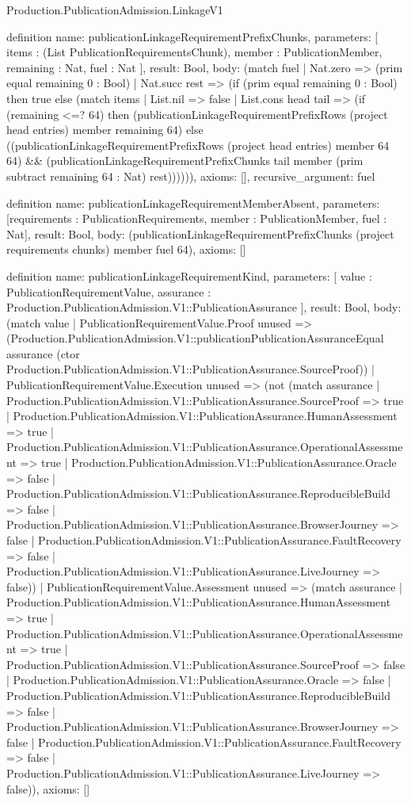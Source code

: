 \begin{lexlean}{Production.PublicationAdmission.LinkageV1}
\begin{semanticmodule}
definition{
  name: publicationLinkageRequirementPrefixChunks,
  parameters: [
    items : (List PublicationRequirementsChunk),
    member : PublicationMember,
    remaining : Nat,
    fuel : Nat
  ],
  result: Bool,
  body: (match fuel
    | Nat.zero => (prim equal remaining 0 : Bool)
    | Nat.succ rest => (if (prim equal remaining 0 : Bool) then true else (match items
      | List.nil => false
      | List.cons head tail => (if (remaining <=? 64) then (publicationLinkageRequirementPrefixRows (project head entries) member remaining 64) else ((publicationLinkageRequirementPrefixRows (project head entries) member 64 64) && (publicationLinkageRequirementPrefixChunks tail member (prim subtract remaining 64 : Nat) rest)))))),
  axioms: [],
  recursive_argument: fuel
}

definition{
  name: publicationLinkageRequirementMemberAbsent,
  parameters: [requirements : PublicationRequirements, member : PublicationMember, fuel : Nat],
  result: Bool,
  body: (publicationLinkageRequirementPrefixChunks (project requirements chunks) member fuel 64),
  axioms: []
}

definition{
  name: publicationLinkageRequirementKind,
  parameters: [
    value : PublicationRequirementValue,
    assurance : Production.PublicationAdmission.V1::PublicationAssurance
  ],
  result: Bool,
  body: (match value
    | PublicationRequirementValue.Proof unused => (Production.PublicationAdmission.V1::publicationPublicationAssuranceEqual assurance (ctor Production.PublicationAdmission.V1::PublicationAssurance.SourceProof))
    | PublicationRequirementValue.Execution unused => (not (match assurance
      | Production.PublicationAdmission.V1::PublicationAssurance.SourceProof => true
      | Production.PublicationAdmission.V1::PublicationAssurance.HumanAssessment => true
      | Production.PublicationAdmission.V1::PublicationAssurance.OperationalAssessment => true
      | Production.PublicationAdmission.V1::PublicationAssurance.Oracle => false
      | Production.PublicationAdmission.V1::PublicationAssurance.ReproducibleBuild => false
      | Production.PublicationAdmission.V1::PublicationAssurance.BrowserJourney => false
      | Production.PublicationAdmission.V1::PublicationAssurance.FaultRecovery => false
      | Production.PublicationAdmission.V1::PublicationAssurance.LiveJourney => false))
    | PublicationRequirementValue.Assessment unused => (match assurance
      | Production.PublicationAdmission.V1::PublicationAssurance.HumanAssessment => true
      | Production.PublicationAdmission.V1::PublicationAssurance.OperationalAssessment => true
      | Production.PublicationAdmission.V1::PublicationAssurance.SourceProof => false
      | Production.PublicationAdmission.V1::PublicationAssurance.Oracle => false
      | Production.PublicationAdmission.V1::PublicationAssurance.ReproducibleBuild => false
      | Production.PublicationAdmission.V1::PublicationAssurance.BrowserJourney => false
      | Production.PublicationAdmission.V1::PublicationAssurance.FaultRecovery => false
      | Production.PublicationAdmission.V1::PublicationAssurance.LiveJourney => false)),
  axioms: []
}


\end{semanticmodule}
\end{lexlean}
